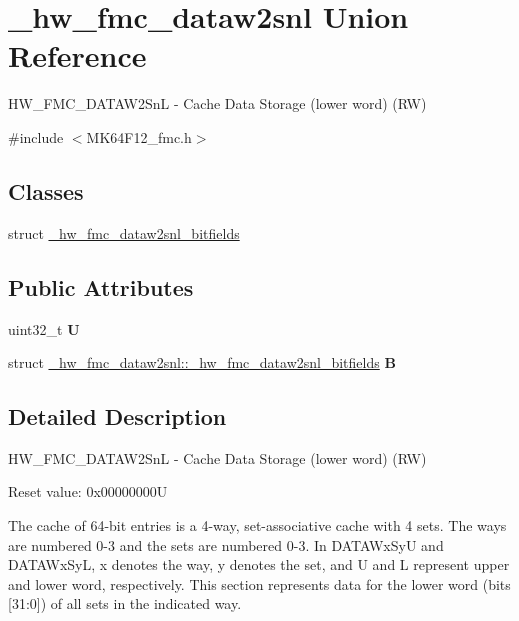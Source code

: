 \hypertarget{union__hw__fmc__dataw2snl}{}\section{\+\_\+hw\+\_\+fmc\+\_\+dataw2snl Union Reference}
\label{union__hw__fmc__dataw2snl}


H\+W\+\_\+\+F\+M\+C\+\_\+\+D\+A\+T\+A\+W2\+SnL -\/ Cache Data Storage (lower word) (RW)  




{\ttfamily \#include $<$M\+K64\+F12\+\_\+fmc.\+h$>$}

\subsection*{Classes}
\begin{DoxyCompactItemize}
\item 
struct \hyperlink{struct__hw__fmc__dataw2snl_1_1__hw__fmc__dataw2snl__bitfields}{\+\_\+hw\+\_\+fmc\+\_\+dataw2snl\+\_\+bitfields}
\end{DoxyCompactItemize}
\subsection*{Public Attributes}
\begin{DoxyCompactItemize}
\item 
uint32\+\_\+t {\bfseries U}\hypertarget{union__hw__fmc__dataw2snl_ab294eaf9ace633f446f8adfc2134b18f}{}\label{union__hw__fmc__dataw2snl_ab294eaf9ace633f446f8adfc2134b18f}

\item 
struct \hyperlink{struct__hw__fmc__dataw2snl_1_1__hw__fmc__dataw2snl__bitfields}{\+\_\+hw\+\_\+fmc\+\_\+dataw2snl\+::\+\_\+hw\+\_\+fmc\+\_\+dataw2snl\+\_\+bitfields} {\bfseries B}\hypertarget{union__hw__fmc__dataw2snl_a49123620309a494677cb475716055124}{}\label{union__hw__fmc__dataw2snl_a49123620309a494677cb475716055124}

\end{DoxyCompactItemize}


\subsection{Detailed Description}
H\+W\+\_\+\+F\+M\+C\+\_\+\+D\+A\+T\+A\+W2\+SnL -\/ Cache Data Storage (lower word) (RW) 

Reset value\+: 0x00000000U

The cache of 64-\/bit entries is a 4-\/way, set-\/associative cache with 4 sets. The ways are numbered 0-\/3 and the sets are numbered 0-\/3. In D\+A\+T\+A\+Wx\+SyU and D\+A\+T\+A\+Wx\+SyL, x denotes the way, y denotes the set, and U and L represent upper and lower word, respectively. This section represents data for the lower word (bits \mbox{[}31\+:0\mbox{]}) of all sets in the indicated way. 

